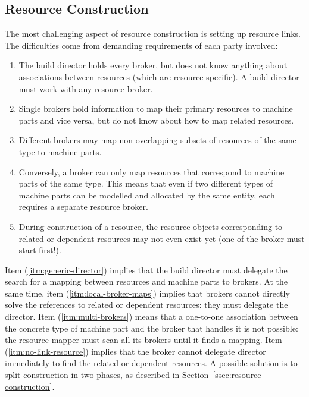 \documentclass[a4paper,twoside]{tce}
\begin{document}
\subsection{Resource Construction}

The most challenging aspect of resource construction is setting up resource
links. The difficulties come from demanding requirements of each party
involved:
\begin{enumerate}
\item\label{itm:generic-director}%
  The build director holds every broker, but does not know anything about
  associations between resources (which are resource-specific). A build
  director must work with any resource broker.
\item\label{itm:local-broker-maps}%
  Single brokers hold information to map their primary resources to machine
  parts and vice versa, but do not know about how to map related resources.
\item\label{itm:multi-brokers}%
  Different brokers may map non-overlapping subsets of resources of the same
  type to machine parts.
\item\label{itm:no-broker-sharing}%
  Conversely, a broker can only map resources that correspond to machine
  parts of the same type. This means that even if two different types of
  machine parts can be modelled and allocated by the same entity, each
  requires a separate resource broker.
\item\label{itm:no-link-resource}%
  During construction of a resource, the resource objects corresponding to
  related or dependent resources may not even exist yet (one of the broker
  must start first!).
\end{enumerate}

Item (\ref{itm:generic-director}) implies that the build director must
delegate the search for a mapping between resources and machine parts to
brokers.
%
At the same time, item (\ref{itm:local-broker-maps}) implies that brokers
cannot directly solve the references to related or dependent resources: they
must delegate the director.
%
Item (\ref{itm:multi-brokers}) means that a one-to-one association between
the concrete type of machine part and the broker that handles it is not
possible: the resource mapper must scan all its brokers until it finds a
mapping.
%
Item (\ref{itm:no-link-resource}) implies that the broker cannot delegate
director immediately to find the related or dependent resources. A possible
solution is to split construction in two phases, as described in
Section~\ref{ssec:resource-construction}.
\end{document}
